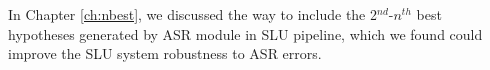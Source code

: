 \documentclass [PhD] {uclathes}
\begin{document}
In Chapter \ref{ch:nbest}, we discussed the way to include the 2$^{nd}$-$n^{th}$ best hypotheses generated by ASR module in SLU pipeline, which we found  could improve the SLU system robustness to ASR errors. 
{}


\end{document}
